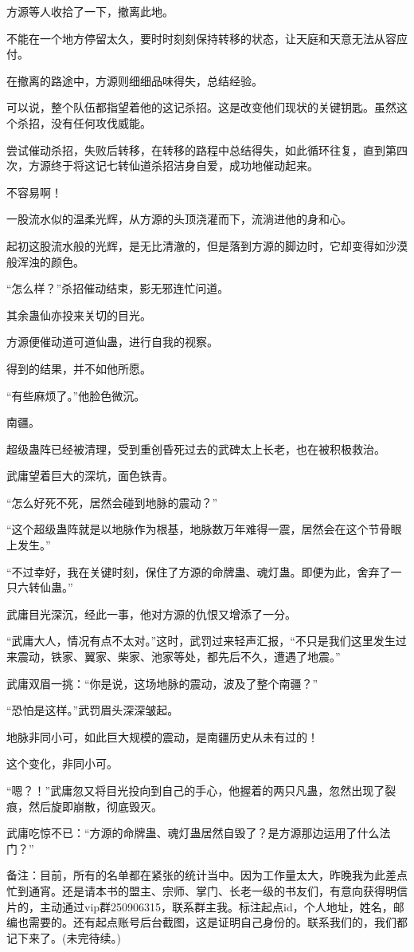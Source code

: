 \begin{this_body}
方源等人收拾了一下，撤离此地。

不能在一个地方停留太久，要时时刻刻保持转移的状态，让天庭和天意无法从容应付。

在撤离的路途中，方源则细细品味得失，总结经验。

可以说，整个队伍都指望着他的这记杀招。这是改变他们现状的关键钥匙。虽然这个杀招，没有任何攻伐威能。

尝试催动杀招，失败后转移，在转移的路程中总结得失，如此循环往复，直到第四次，方源终于将这记七转仙道杀招洁身自爱，成功地催动起来。

不容易啊！

一股流水似的温柔光辉，从方源的头顶浇灌而下，流淌进他的身和心。

起初这股流水般的光辉，是无比清澈的，但是落到方源的脚边时，它却变得如沙漠般浑浊的颜色。

“怎么样？”杀招催动结束，影无邪连忙问道。

其余蛊仙亦投来关切的目光。

方源便催动道可道仙蛊，进行自我的视察。

得到的结果，并不如他所愿。

“有些麻烦了。”他脸色微沉。

南疆。

超级蛊阵已经被清理，受到重创昏死过去的武碑太上长老，也在被积极救治。

武庸望着巨大的深坑，面色铁青。

“怎么好死不死，居然会碰到地脉的震动？”

“这个超级蛊阵就是以地脉作为根基，地脉数万年难得一震，居然会在这个节骨眼上发生。”

“不过幸好，我在关键时刻，保住了方源的命牌蛊、魂灯蛊。即便为此，舍弃了一只六转仙蛊。”

武庸目光深沉，经此一事，他对方源的仇恨又增添了一分。

“武庸大人，情况有点不太对。”这时，武罚过来轻声汇报，“不只是我们这里发生过来震动，铁家、翼家、柴家、池家等处，都先后不久，遭遇了地震。”

武庸双眉一挑：“你是说，这场地脉的震动，波及了整个南疆？”

“恐怕是这样。”武罚眉头深深皱起。

地脉非同小可，如此巨大规模的震动，是南疆历史从未有过的！

这个变化，非同小可。

“嗯？！”武庸忽又将目光投向到自己的手心，他握着的两只凡蛊，忽然出现了裂痕，然后旋即崩散，彻底毁灭。

武庸吃惊不已：“方源的命牌蛊、魂灯蛊居然自毁了？是方源那边运用了什么法门？”

备注：目前，所有的名单都在紧张的统计当中。因为工作量太大，昨晚我为此差点忙到通宵。还是请本书的盟主、宗师、掌门、长老一级的书友们，有意向获得明信片的，主动通过vip群250906315，联系群主我。标注起点id，个人地址，姓名，邮编也需要的。还有起点账号后台截图，这是证明自己身份的。联系我们的，我们都记下来了。(未完待续。)

\end{this_body}

